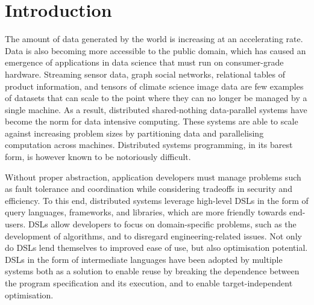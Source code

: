 \section{Introduction}


The amount of data generated by the world is increasing at an accelerating rate. Data is also becoming more accessible to the public domain, which has caused an emergence of applications in data science that must run on consumer-grade hardware. Streaming sensor data, graph social networks, relational tables of product information, and tensors of climate science image data are few examples of datasets that can scale to the point where they can no longer be managed by a single machine. As a result, distributed shared-nothing data-parallel systems have become the norm for data intensive computing. These systems are able to scale against increasing problem sizes by partitioning data and parallelising computation across machines. Distributed systems programming, in its barest form, is however known to be notoriously difficult.

Without proper abstraction, application developers must manage problems such as fault tolerance and coordination while considering tradeoffs in security and efficiency. To this end, distributed systems leverage high-level DSLs in the form of query languages, frameworks, and libraries, which are more friendly towards end-users. DSLs allow developers to focus on domain-specific problems, such as the development of algorithms, and to disregard engineering-related issues. Not only do DSLs lend themselves to improved ease of use, but also optimisation potential. DSLs in the form of intermediate languages have been adopted by multiple systems both as a solution to enable reuse by breaking the dependence between the program specification and its execution, and to enable target-independent optimisation.



